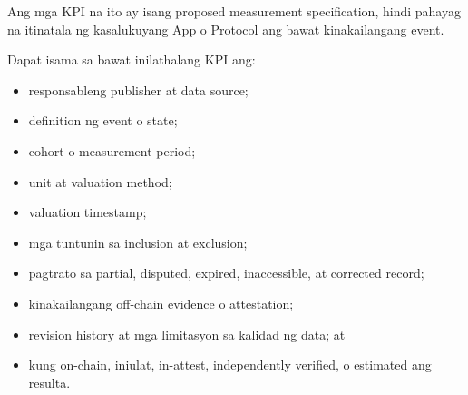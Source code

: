 \documentclass[11pt]{article}
\begin{document}
Ang mga KPI na ito ay isang proposed measurement specification, hindi pahayag na itinatala ng kasalukuyang App o Protocol ang bawat kinakailangang event.

Dapat isama sa bawat inilathalang KPI ang:

\begin{itemize}[leftmargin=*]
\item responsableng publisher at data source;
\item definition ng event o state;
\item cohort o measurement period;
\item unit at valuation method;
\item valuation timestamp;
\item mga tuntunin sa inclusion at exclusion;
\item pagtrato sa partial, disputed, expired, inaccessible, at corrected record;
\item kinakailangang off-chain evidence o attestation;
\item revision history at mga limitasyon sa kalidad ng data; at
\item kung on-chain, iniulat, in-attest, independently verified, o estimated ang resulta.
\end{itemize}
\end{document}
